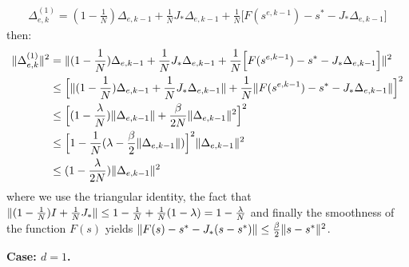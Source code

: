 \begin{equation}
\begin{split}
\Delta_{e,k}^{(1)} = (1-\frac{1}{N})\Delta_{e,k-1} + \frac{1}{N}J_* \Delta_{e,k-1} +  \frac{1}{N} \Big[ F(s^{e,k-1}) - s^* -J_* \Delta_{e,k-1}\Big]
\end{split}
\end{equation}
then:
\begin{equation}
\begin{split}
\lVert\Delta_{e,k}^{(1)}\rVert^2 & = \lVert(1-\frac{1}{N})\Delta_{e,k-1} + \frac{1}{N} J_* \Delta_{e,k-1} +  \frac{1}{N} \Big[ F(s^{e,k-1}) - s^* -J_* \Delta_{e,k-1}\Big]\rVert^2 \\
& \leq \Big[ \lVert(1-\frac{1}{N}) \Delta_{e,k-1} + \frac{1}{N}J_* \Delta_{e,k-1} \rVert + \frac{1}{N} \lVert F(s^{e,k-1}) - s^* -J_* \Delta_{e,k-1}\rVert\Big]^2 \\
& \leq \Big[ (1-\frac{\lambda}{N})\lVert\Delta_{e,k-1}\rVert + \frac{\beta}{2N} \lVert\Delta_{e,k-1}\rVert^2 \Big]^2\\
& \leq \Big[ 1 - \frac{1}{N}(\lambda - \frac{\beta}{2} \lVert\Delta_{e,k-1}\rVert) \Big]^2 \lVert\Delta_{e,k-1}\rVert^2\\
& \leq (1 - \frac{\lambda}{2N})\lVert\Delta_{e,k-1}\rVert^2
\end{split}
\end{equation}
where we use the triangular identity, the fact that $\lVert(1 - \frac{1}{N})I + \frac{1}{N} J_*\rVert \leq 1 - \frac{1}{N} + \frac{1}{N}(1-\lambda) = 1 - \frac{\lambda}{N}$ and finally the smoothness of the function $F(s)$ yields $\lVert F(s) - s^* - J_* (s - s^*)\rVert \leq \frac{\beta}{2}\lVert s - s^*\rVert^2$.

\textbf{Case: $d=1$.} 

